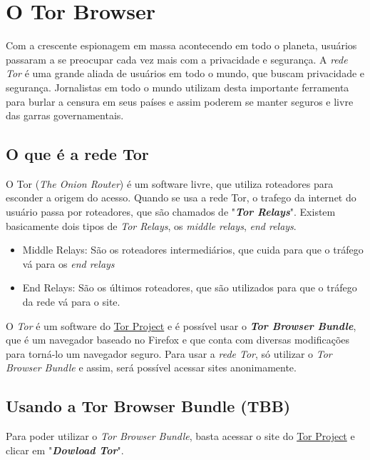 \documentclass[12pt, letterpaper, Monospace:12]{report}
\begin{document}
\section{O Tor Browser}
	Com a crescente espionagem em massa acontecendo em todo o planeta, usuários passaram a se preocupar cada vez mais com a privacidade e segurança. A \textit{rede Tor} é uma grande aliada de usuários em todo o mundo, que buscam privacidade e segurança. Jornalistas em todo o mundo utilizam desta importante ferramenta para burlar a censura em seus países e assim poderem se manter seguros e livre das garras governamentais.\\

\subsection{O que é a rede Tor}
	O Tor (\textit{The Onion Router}) é um software livre, que utiliza roteadores para esconder a origem do acesso. Quando se usa a rede Tor, o trafego da internet do usuário passa por roteadores, que são chamados de "\textbf{\textit{Tor Relays}}". Existem basicamente dois tipos de \textit{Tor Relays}, os \textit{middle relays}, \textit{end relays}.

	\begin{itemize}
		\item Middle Relays: São os roteadores intermediários, que cuida para que o tráfego vá para os \textit{end relays}
		\item End Relays: São os últimos roteadores, que são utilizados para que o tráfego da rede vá para o site.
	\end{itemize}

	O \textit{Tor} é um software do \href{http://torproject.org/}{Tor Project} e é possível usar o \textbf{\textit{Tor Browser Bundle}}, que é um navegador baseado no Firefox e que conta com diversas modificações para torná-lo um navegador seguro. Para usar a \textit{rede Tor}, só utilizar o \textit{Tor Browser Bundle} e assim, será possível acessar sites anonimamente.\\

\subsection{Usando a Tor Browser Bundle (TBB)}
	Para poder utilizar o \textit{Tor Browser Bundle}, basta acessar o site do \href{http://torproject.org/}{Tor Project} e clicar em "\textit{\textbf{Dowload Tor}}".
\end{document}
